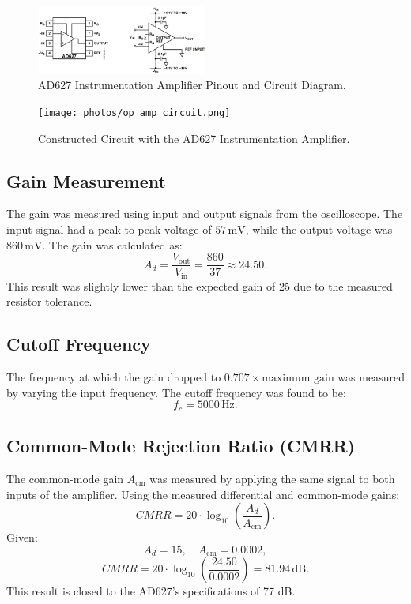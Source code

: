 \begin{figure}[H]
  \centering
  \includegraphics[width=0.5\textwidth]{photos/ad627_instrumentation_amplifier_pinout_and_diagram.png}
  \caption{AD627 Instrumentation Amplifier Pinout and Circuit Diagram.}
  \label{fig:ad627_diagram}
\end{figure}

\begin{figure}[H]
  \centering
  \texttt{[image: photos/op\_amp\_circuit.png]}
  \caption{Constructed Circuit with the AD627 Instrumentation Amplifier.}
  \label{fig:circuit}
\end{figure}

\subsection{Gain Measurement}
The gain was measured using input and output signals from the oscilloscope. The input signal had a peak-to-peak voltage of
\( 57 \, \text{mV} \), while the output voltage was \( 860 \, \text{mV} \). The gain was calculated as:
\[
  A_d = \frac{V_\text{out}}{V_\text{in}} = \frac{860}{37} \approx 24.50.
\]
This result was slightly lower than the expected gain of 25 due to the measured resistor tolerance.

\subsection{Cutoff Frequency}
The frequency at which the gain dropped to \( 0.707 \times \text{maximum gain} \) was measured by varying the input frequency.
The cutoff frequency was found to be:
\[
  f_c = 5000 \, \text{Hz}.
\]

\subsection{Common-Mode Rejection Ratio (CMRR)}
The common-mode gain \( A_\text{cm} \) was measured by applying the same signal to both inputs of the amplifier. Using the measured
differential and common-mode gains:
\[
  CMRR = 20 \cdot \log_{10}\left(\frac{A_d}{A_\text{cm}}\right).
\]
Given:
\[
  A_d = 15, \quad A_\text{cm} = 0.0002,
\]
\[
  CMRR = 20 \cdot \log_{10}\left(\frac{24.50}{0.0002}\right) = 81.94 \, \text{dB}.
\]
This result is closed to the AD627's specifications of 77 dB.

